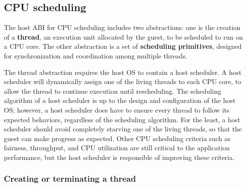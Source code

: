 \subsection{CPU scheduling}
\label{sec:abi:thread}

The host ABI for CPU scheduling includes two abstractions:
one is the creation of a {\bf thread}, an execution unit allocated by the guest,
to be scheduled to run on a CPU core.
The other abstraction is a set of {\bf scheduling primitives},
designed for synchronization and coordination
among multiple threads.



The thread abstraction requires the host OS to contain a host scheduler.
A host scheduler will dynamically assign one of the living threads to each CPU core, to allow the thread to continue execution until rescheduling.
The scheduling algorithm of a host scheduler is up to
the design and configuration of the host OS;
however, a host scheduler does have to ensure every thread to follow its expected behaviors,
regardless of the scheduling algorithm.
For the least, a host scheduler should avoid completely starving one of the living threads,
so that the guest can make progress as expected.
Other CPU scheduling criteria such as fairness, throughput, and CPU utilization
are still critical to the application performance, but the host scheduler is responsible of improving these criteria.






\subsubsection*{Creating or terminating a thread}





